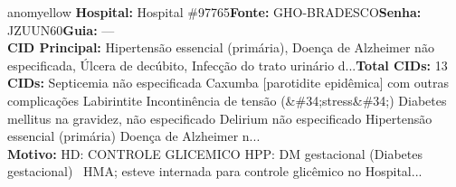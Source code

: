 \documentclass[a4paper,10pt]{article}
\begin{document}
\begin{anomalycard}[Interna\c{c}\~{a}o \#119195 | Pac. \#98845 | MODERADO (z=2.18) | LOS: 9d | 01/03/2026\,$\to$\,10/03/2026]{anomyellow}
\textbf{Hospital:} Hospital \#97765\quad \textbf{Fonte:} GHO-BRADESCO\quad \textbf{Senha:} JZUUN60\quad \textbf{Guia:} ---\\

\textbf{CID Principal:} {\small Hipertensão essencial (primária), Doença de Alzheimer não especificada, Úlcera de decúbito, Infecção do trato urinário d...}\quad\textbf{Total CIDs:} 13\\

\textbf{CIDs:} {\scriptsize Septicemia não especificada \textbar{} Caxumba [parotidite epidêmica] com outras complicações \textbar{} Labirintite \textbar{} Incontinência de tensão (\&\#34;stress\&\#34;) \textbar{} Diabetes mellitus na gravidez, não especificado \textbar{} Delirium não especificado \textbar{} Hipertensão essencial (primária) \textbar{} Doença de Alzheimer n...}\\

\textbf{Motivo:} {\scriptsize HD: CONTROLE GLICEMICO  HPP: DM gestacional (Diabetes gestacional)   HMA; esteve internada para controle glicêmico no Hospital...}\\



\end{anomalycard}
\end{document}
